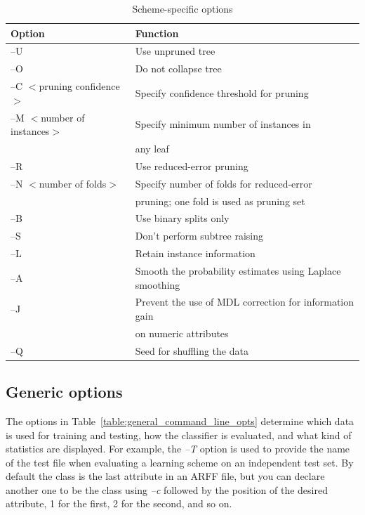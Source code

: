 \begin{table}[thp]
\footnotesize
{\centering \begin{tabular}{ll}
\hline
Option & Function \\
\hline
--U & Use unpruned tree \\
--O & Do not collapse tree \\
--C $<$pruning confidence$>$ & Specify confidence threshold for pruning \\
--M $<$number of instances$>$ & Specify minimum number of instances in \\
& any leaf \\
--R & Use reduced-error pruning \\
--N $<$number of folds$>$ & Specify number of folds for reduced-error \\
& pruning; one fold is used as pruning set \\
--B & Use binary splits only \\
--S & Don't perform subtree raising \\
--L & Retain instance information \\
--A & Smooth the probability estimates using Laplace smoothing \\
--J & Prevent the use of MDL correction for information gain \\
& on numeric attributes \\
--Q & Seed for shuffling the data \\
\hline
\end{tabular} \footnotesize \par}
\caption{\label{table:j48_command_line_opts}Scheme-specific options}
\end{table}

\subsection{Generic options}

The options in Table~\ref{table:general_command_line_opts} determine which
data is used for training and testing, how the classifier is
evaluated, and what kind of statistics are displayed. For example, the
\textit{--T} option is used to provide the name of the test file when evaluating
a learning scheme on an independent test set. By default the class is
the last attribute in an ARFF file, but you can declare another one to
be the class using \textit{--c} followed by the position of the
desired attribute, 1 for the first, 2 for the second, and so on.

